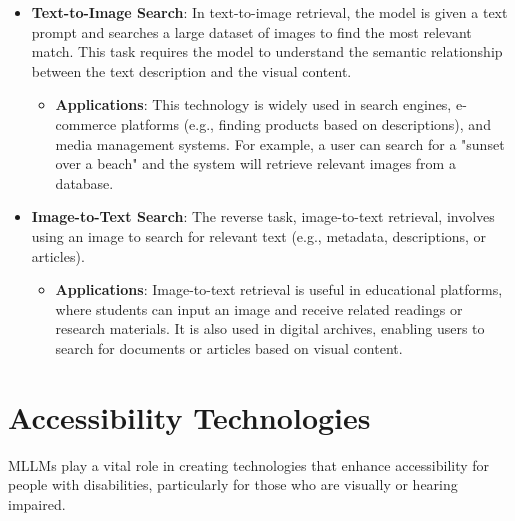 \begin{itemize}
    \item \textbf{Text-to-Image Search}: In text-to-image retrieval, the model is given a text prompt and searches a large dataset of images to find the most relevant match. This task requires the model to understand the semantic relationship between the text description and the visual content.
    \begin{itemize}
        \item \textbf{Applications}: This technology is widely used in search engines, e-commerce platforms (e.g., finding products based on descriptions), and media management systems. For example, a user can search for a "sunset over a beach" and the system will retrieve relevant images from a database.
    \end{itemize}
    \item \textbf{Image-to-Text Search}: The reverse task, image-to-text retrieval, involves using an image to search for relevant text (e.g., metadata, descriptions, or articles).
    \begin{itemize}
        \item \textbf{Applications}: Image-to-text retrieval is useful in educational platforms, where students can input an image and receive related readings or research materials. It is also used in digital archives, enabling users to search for documents or articles based on visual content.
    \end{itemize}
\end{itemize}

\section{Accessibility Technologies}

MLLMs play a vital role in creating technologies that enhance accessibility for people with disabilities, particularly for those who are visually or hearing impaired.

